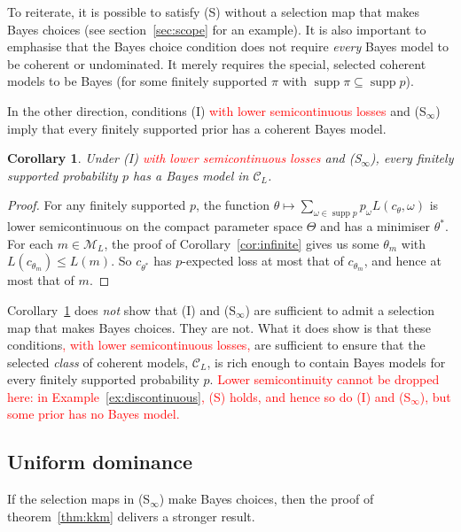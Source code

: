 \documentclass[11pt]{article}
\newtheorem{corollary}[theorem]{Corollary}
\theoremstyle{definition}
\theoremstyle{remark}
\newcommand{\M}{\mathcal M}
\newcommand{\C}{\mathcal C}
\newcommand{\supp}{\operatorname{supp}}
\begin{document}
To reiterate, it is possible to satisfy (S) without a selection map that makes Bayes choices (see section~\ref{sec:scope} for an example). It is also important to emphasise that the Bayes choice condition does not require \emph{every} Bayes model to be coherent or undominated. It merely requires the special, selected coherent models to be Bayes (for some finitely supported $\pi$ with $\supp\pi\subseteq\supp p$). 



In the other direction, conditions (I) \textcolor{red}{with lower semicontinuous losses} and (S$_\infty$) imply that every finitely supported prior has a coherent Bayes model. 
\begin{corollary}\label{cor:bayes}
Under (I) \textcolor{red}{with lower semicontinuous losses} and (S$_\infty$), every finitely supported probability $p$ has a Bayes model in $\C_L$.
\end{corollary}
\begin{proof}
For any finitely supported $p$, the function $\theta\mapsto\sum_{\omega\in\supp p}p_\omega L(c_\theta,\omega)$ is lower semicontinuous on the compact parameter space $\Theta$ and has a minimiser $\theta^*$. For each $m\in\M_L$, the proof of Corollary~\ref{cor:infinite} gives us some $\theta_m$ with $L(c_{\theta_m})\le L(m)$. So $c_{\theta^*}$ has $p$-expected loss at most that of $c_{\theta_m}$, and hence at most that of $m$.
\end{proof}
Corollary~\ref{cor:bayes} does \textit{not} show that (I) and (S$_\infty$) are sufficient to admit a selection map that makes Bayes choices. They are not. What it does show is that these conditions\textcolor{red}{, with lower semicontinuous losses,} are sufficient to ensure that the selected \textit{class} of coherent models, $\C_L$, is rich enough to contain Bayes models for every finitely supported probability $p$. \textcolor{red}{Lower semicontinuity cannot be dropped here: in Example~\ref{ex:discontinuous}, (S) holds, and hence so do (I) and (S$_\infty$), but some prior has no Bayes model.}





\subsection{Uniform dominance}


If the selection maps in (S$_\infty$) make Bayes choices, then the proof of theorem~\ref{thm:kkm} delivers a stronger result.
\end{document}
